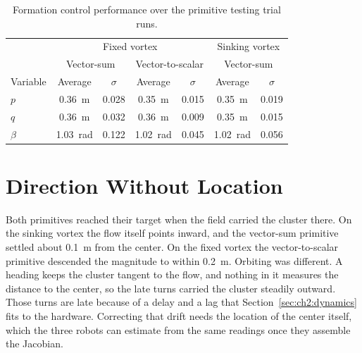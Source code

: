 \begin{table}[htbp]
\centering
\caption{Formation control performance over the primitive testing trial
runs.}
\label{tab:ch5:formation}
\begin{tabular}{lcccccc}
\hline
 & \multicolumn{4}{c}{Fixed vortex} & \multicolumn{2}{c}{Sinking vortex} \\
 & \multicolumn{2}{c}{Vector-sum} & \multicolumn{2}{c}{Vector-to-scalar} & \multicolumn{2}{c}{Vector-sum} \\
Variable & Average & $\sigma$ & Average & $\sigma$ & Average & $\sigma$ \\
\hline
$p$ & 0.36~m & 0.028 & 0.35~m & 0.015 & 0.35~m & 0.019 \\
$q$ & 0.36~m & 0.032 & 0.36~m & 0.009 & 0.35~m & 0.015 \\
$\beta$ & 1.03~rad & 0.122 & 1.02~rad & 0.045 & 1.02~rad & 0.056 \\
\hline
\end{tabular}
\end{table}

\section{Direction Without Location}
\label{sec:ch5:summary}

Both primitives reached their target when the field carried the cluster
there. On the sinking vortex the flow itself points inward, and the
vector-sum primitive settled about 0.1~m from the center. On the fixed
vortex the vector-to-scalar primitive descended the magnitude to within
0.2~m. Orbiting was different. A heading keeps the cluster tangent to the
flow, and nothing in it measures the distance to the center, so the late
turns carried the cluster steadily outward. Those turns are late because of
a delay and a lag that Section~\ref{sec:ch2:dynamics} fits to the hardware. Correcting that drift needs the
location of the center itself, which the three robots can estimate from
the same readings once they assemble the Jacobian.
